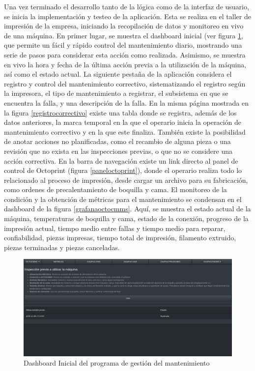 Una vez terminado el desarrollo tanto de la lógica como de la interfaz de usuario, se inicia la implementación y testeo de la aplicación. Esta se realiza en el taller de impresión de la empresa, iniciando la recopilación de datos y monitoreo en vivo de una máquina. En primer lugar, se muestra el dashboard inicial (ver figura \ref{inspprevia}, que permite un fácil y rápido control del mantenimiento diario, mostrando una serie de pasos para considerar esta acción como realizada. Asimismo, se muestra en vivo la hora y fecha de la última acción previa a la utilización de la máquina, así como el estado actual. La siguiente pestaña de la aplicación considera el registro y control del mantenimiento correctivo, sistematizando el registro según la impresora, el tipo de mantenimiento a registrar, el subsistema en que se encuentra la falla, y una descripción de la falla. En la misma página mostrada en la figura \ref{registrocorrectivo} existe una tabla donde se registra, además de los datos anteriores, la marca temporal en la que el operario inicia la operación de mantenimiento correctivo y en la que este finaliza. También existe la posibilidad de anotar acciones no planificadas, como el recambio de alguna pieza o una revisión que no exista en las inspecciones previas, o que no se considere una acción correctiva. En la barra de navegación existe un link directo al panel de control de Octoprint (figura \ref{paneloctoprint}), donde el operario realiza todo lo relacionado al proceso de impresión, desde cargar un archivo para su fabricación, como ordenes de precalentamiento de boquilla y cama. El monitoreo de la condición y la obtención de métricas para el mantenimiento se condensan en el dashboard de la figura \ref{grafanaoctocmms}. Aquí, se muestra el estado actual de la máquina, temperaturas de boquilla y cama, estado de la conexión, progreso de la impresión actual, tiempo medio entre fallas y tiempo medio para reparar, confiabilidad, piezas impresas, tiempo total de impresión, filamento extruido, piezas terminadas y piezas canceladas. 

\begin{figure}[H]
\centering
\includegraphics[scale=0.4,angle=90]{images/inspprevia.png}
\caption{Dashboard Inicial del programa de gestión del mantenimiento}
\label{inspprevia}
\end{figure}

